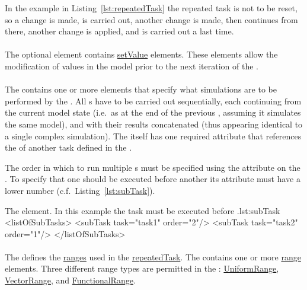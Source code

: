 In the example in  Listing~\ref{lst:repeatedTask} the repeated task is not to be reset, so a change is made,  is carried out, another change is made, then  continues from there, another change is applied, and  is carried out a last time.

\paragraph{}
\label{sec:changes}
The optional  element contains \hyperref[class:setValue]{setValue} elements. These elements allow the modification of values in the model prior to the next iteration of the .

\paragraph{}
\label{class:subTask}
The  contains one or more  elements that specify what simulations are to be performed by the .
All s have to be carried out sequentially, each continuing from the current model state (i.e.\ as at the end of the previous , assuming it simulates the same model), and with their results concatenated (thus appearing identical to a single complex simulation). The  itself has one required attribute  that references the  of another task defined in the .

The order in which to run multiple s must be specified using the  attribute on the . To specify that one  should be executed before another its  attribute must have a lower number (c.f.\ Listing~\ref{lst:subTask}).

\begin{myXmlLst}{The  element. In this example the task  must be executed before .}{lst:subTask}
<listOfSubTasks>
	<subTask task="task1" order="2"/> 
	<subTask task="task2" order="1"/> 
</listOfSubTasks>
\end{myXmlLst}

\paragraph{}
\label{sec:listOfRanges}
The  defines the \hyperref[class:range]{ranges} used in the \hyperref[class:repeatedTask]{repeatedTask}. The  contains one or more \hyperref[class:range]{range} elements. Three different range types are permitted in the : \hyperref[class:uniformRange]{UniformRange}, \hyperref[class:vectorRange]{VectorRange}, and \hyperref[class:functionalRange]{FunctionalRange}.

